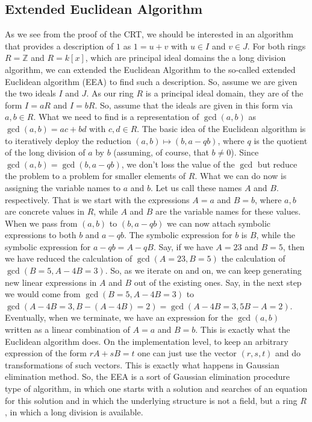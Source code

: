 \documentclass[11pt,a4paper]{amsart}
\newcommand{\Z}{{\mathbb{Z}}}
\begin{document}
\subsection{Extended Euclidean Algorithm} 
As we see from the proof of the CRT, we should be interested in an algorithm that provides a description of $1$ as $1 = u + v$ with $u \in I$ and $v \in J$. 
For both rings $R = \Z$ and $R = k[x]$, which are principal ideal domains the a long division algorithm, we can extended the Euclidean Algorithm to the so-called extended Euclidean algorithm (EEA) to find such a description. So, assume we are given the two ideals $I$ and $J$. As our ring $R$ is a principal ideal domain, they are of the form $I = a R$ and $I = b R$. So, assume that the ideals are given in this form via $a,b \in R$. What we need to find is a representation of $\gcd(a,b)$ as $\gcd(a,b) = a c + b d$ with $c,d \in R$. The basic idea of the Euclidean algorithm is to iteratively deploy the reduction $(a,b) \mapsto (b, a - q b)$, where $q$ is the quotient of the long division of $a$ by $b$ (assuming, of course, that $b \ne 0$). Since $\gcd(a,b) = \gcd(b,a-qb)$, we don't loss the value of the $\gcd$ but reduce the problem to a problem for smaller elements of $R$. What we can do now is assigning the variable names to $a$ and $b$. Let us call these names $A$ and $B$. respectively. That is we start with the expressions $A = a$ and $B = b$, where $a,b$ are concrete values in $R$, while $A$ and $B$ are the variable names for these values. When we pass from $(a,b)$ to $(b,a-qb)$ we can now attach symbolic expressions to both $b$ and $a-qb$. The symbolic expression for $b$ is $B$, while the symbolic expression for $a-q b= A - q B$. Say, if we have $A = 23$ and $B=5$, then we have reduced the calculation of $\gcd(A=23, B = 5)$ the calculation of $\gcd(B=5, A - 4 B = 3)$. So, as we iterate on and on, we can keep generating new linear expressions in $A$ and $B$ out of the existing ones. Say, in the next step we would come from $\gcd(B=5,A - 4 B =3)$ to $\gcd(A - 4B =3, B - (A-4B) =2) = \gcd(A - 4 B =3, 5 B - A = 2)$. Eventually, when we terminate, we have an expression for the $\gcd(a,b)$ written as a linear combination of $A=a$ and $B=b$. This is exactly what the Euclidean algorithm does. On the implementation level, to keep an arbitrary expression of the form $r A + s B =  t$ one can just use the vector $(r,s,t)$ and do transformations of such vectors. This is exactly what happens in Gaussian elimination method. So, the EEA is a sort of Gaussian elimination procedure type of algorithm, in which one starts with a solution and searches of an equation for this solution and in which the underlying structure is not a field, but a ring $R$, in which a long division is available. 
\end{document}
